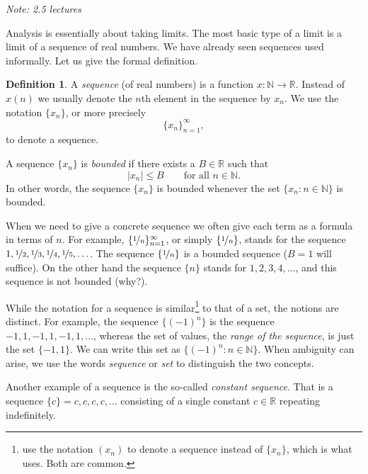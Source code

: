 \documentclass[12pt]{book}
\newcommand{\abs}[1]{\left\lvert {#1} \right\rvert}
\newcommand{\R}{{\mathbb{R}}}
\newcommand{\N}{{\mathbb{N}}}
\newcommand{\myindex}[1]{#1\index{#1}}
\newcommand{\sectionnotes}[1]{\noindent \emph{Note: #1} \medskip \par}
\theoremstyle{plain}
\theoremstyle{remark}
\theoremstyle{definition}
\newtheorem{defn}[thm]{Definition}
\theoremstyle{exercise}
\theoremstyle{example}
\begin{document}
\sectionnotes{2.5 lectures}

Analysis is essentially about taking limits.  The most basic type of a limit
is a limit of a sequence of real numbers.
We have already seen sequences used informally.  Let us give the formal
definition.

\begin{defn}
A \emph{\myindex{sequence}} (of real numbers) is a function $x \colon \N \to \R$.  Instead of $x(n)$ we 
usually denote the $n$th element in the sequence by $x_n$.  We 
use the notation $\{ x_n \}$, or more precisely
\begin{equation*}
\{ x_n \}_{n=1}^\infty,
\end{equation*}
to denote a sequence.

A sequence $\{ x_n \}$ is \emph{bounded} if
there exists a $B \in \R$ such that
\begin{equation*}
\abs{x_n} \leq B \qquad \text{for all $n \in \N$.}
\end{equation*}
In other words, the sequence $\{x_n\}$ is bounded whenever
the set $\{ x_n : n \in \N \}$
is bounded.
\end{defn}

When we need
to give a concrete sequence we often give each term as a formula in
terms of $n$.
For example, $\{ \nicefrac{1}{n} \}_{n=1}^\infty$, or simply $\{
\nicefrac{1}{n} \}$, stands for
the sequence $1, \nicefrac{1}{2}, \nicefrac{1}{3}, \nicefrac{1}{4},
\nicefrac{1}{5}, \ldots$.
The sequence $\{ \nicefrac{1}{n} \}$
is a bounded sequence ($B=1$ will
suffice).  On the other hand the sequence $\{ n \}$ stands for
$1,2,3,4,\ldots$, and this sequence is not bounded (why?).

While the notation for a sequence
is similar\footnote{\cite{BS} use the notation $(x_n)$ to denote
a sequence instead of $\{ x_n \}$, which is what \cite{Rudin:baby} uses.
Both are common.}
to that of a set, the notions are
distinct.  For example, the sequence $\{ {(-1)}^n \}$ is the sequence
$-1,1,-1,1,-1,1,\ldots$, whereas the set of values, the
\emph{range of the sequence},
is just the set $\{ -1, 1 \}$.  We can write this set
as $\{ {(-1)}^n : n \in \N \}$.   When ambiguity can arise, we
use the words \emph{sequence} or \emph{set} to distinguish the two
concepts.

Another example of a sequence is the so-called \emph{\myindex{constant sequence}}.
That is a sequence $\{ c \} = c,c,c,c,\ldots$ consisting of a single
constant $c \in \R$ repeating indefinitely.
\end{document}
